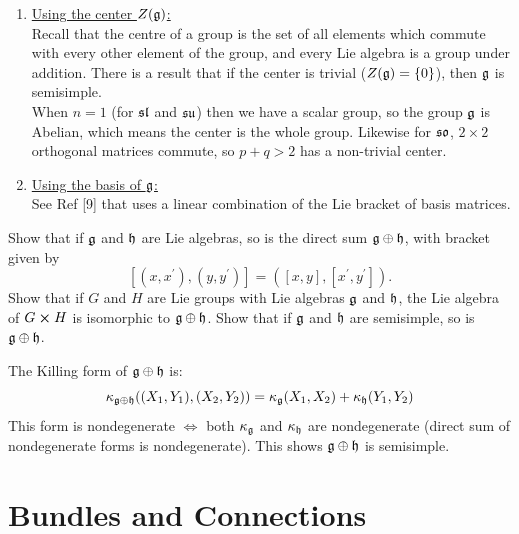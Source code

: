 \documentclass[10pt]{article}
\begin{document}
\begin{enumerate}
\begin{itemize}
		\end{itemize}
	\item \underline{Using the center $Z(\mathfrak{g})$:}\\
		Recall that the centre of a group is the set of all elements which commute with every other element of the group, and every Lie algebra is a group under addition. There is a result that if the center is trivial ($Z(\mathfrak{g}) = \lbrace0\rbrace$), then $\mathfrak{g}$ is semisimple.\\
		When $n=1$ (for $\mathfrak{sl}$ and $\mathfrak{su}$) then we have a scalar group, so the group $\mathfrak{g}$ is Abelian, which means the center is the whole group. Likewise for $\mathfrak{so}$, $2\times2$ orthogonal matrices commute, so $p+q > 2$ has a non-trivial center.
	\item \underline{Using the basis of $\mathfrak{g}$:}\\
	See Ref [9] that uses a linear combination of the Lie bracket of basis matrices.
\end{enumerate}


\begin{example}
	Show that if $\mathfrak{g}$ and $\mathfrak{h}$ are Lie algebras, so is the direct sum $\mathfrak{g} \oplus \mathfrak{h}$, with bracket given by
	$$
	[(x,x^\prime),(y,y^\prime)] = ([x,y],[x^\prime,y^\prime]).
	$$
	Show that if $G$ and $H$ are Lie groups with Lie algebras $\mathfrak{g}$ and $\mathfrak{h}$, the Lie algebra of $G \cross H$ is isomorphic to $\mathfrak{g} \oplus \mathfrak{h}$. Show that if $\mathfrak{g}$ and $\mathfrak{h}$ are semisimple, so is $\mathfrak{g} \oplus \mathfrak{h}$.
\end{example}
\sol The Killing form of $\mathfrak{g} \oplus \mathfrak{h}$ is:
$$
\kappa_{\mathfrak{g} \oplus \mathfrak{h}}((X_1, Y_1), (X_2, Y_2)) = \kappa_{\mathfrak{g}}(X_1, X_2) + \kappa_{\mathfrak{h}}(Y_1, Y_2)
$$
This form is nondegenerate $\Leftrightarrow$ both $\kappa_{\mathfrak{g}}$ and $\kappa_{\mathfrak{h}}$ are nondegenerate (direct sum of nondegenerate forms is nondegenerate). This shows $\mathfrak{g} \oplus \mathfrak{h}$ is semisimple.



\newpage
\section{Bundles and Connections}\label{b2c2}
\end{document}
